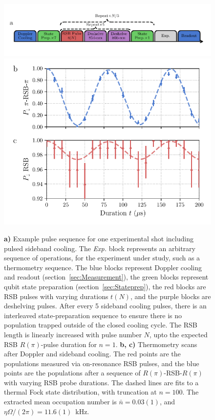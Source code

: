     \begin{figure}
        \begin{center}
        \noindent\includegraphics[width=\linewidth]{
            figures/pdf_figure/pulse_sequence.pdf
            }
        \noindent\includegraphics[width=0.75\linewidth]{
            figures/pdf_figure/sideband_thermometry.pdf
            }

        \end{center}
        \caption{
            \textbf{a)} Example pulse sequence for one experimental shot including pulsed sideband cooling. The \emph{Exp.} block represents an arbitrary sequence of operations, for the experiment under study, such as a thermometry sequence.
            The blue blocks represent Doppler cooling and readout (section~\ref{sec:Measurement}), the green blocks represent qubit state preparation (section~\ref{sec:Stateprep}), the red blocks are RSB pulses with varying durations $t(N)$, and the purple blocks are deshelving pulses. After every 5 sideband cooling pulses, there is an interleaved state-preparation sequence to ensure there is no population trapped outside of the closed cooling cycle. The RSB length is linearly increased with pulse number $N$, upto the expected RSB $R(\pi)$-pulse duration for $n=1$.  
            \textbf{b, c)} Thermometry scans after Doppler and sideband cooling. The red points are the populations measured via on-resonance RSB pulses, and the blue points are the populations after a sequence of $R(\pi)$-RSB-$R(\pi)$ with varying RSB probe durations. The dashed lines are fits to a thermal Fock state distribution, with truncation at $n = 100$. The extracted mean occupation number is $\bar{n} = 0.03(1)$, and $\eta\Omega/(2\pi) = 11.6(1)$~\unit{\kHz}. 
            }
        \label{fig:SBC}
    \end{figure}
